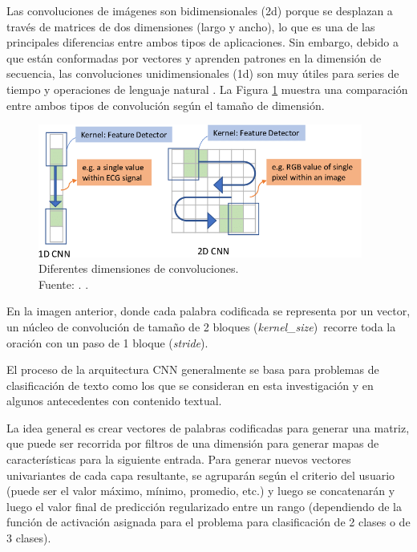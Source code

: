 \begin{itemize}
	Las convoluciones de imágenes son bidimensionales (2d) porque se desplazan a través de matrices de dos dimensiones (largo y ancho), lo que es una de las principales diferencias entre ambos tipos de aplicaciones. Sin embargo, debido a que están conformadas por vectores y aprenden patrones en la dimensión de secuencia, las convoluciones unidimensionales (1d) son muy útiles para series de tiempo y operaciones de lenguaje natural \parencite{bk_rao2019nlp_pytorch}. La Figura \ref{2:fig41} muestra una comparación entre ambos tipos de convolución según el tamaño de dimensión.

	\begin{figure}[!ht]
		\begin{center}
			\includegraphics[width=0.95\textwidth]{2/figures/2D-convolutional-example.png}
			\caption[Diferentes dimensiones de convoluciones]{Diferentes dimensiones de convoluciones.\\
			Fuente: \cite{tec_missinglink_conv1d}. .}
			\label{2:fig41}
		\end{center}
	\end{figure}

	En la imagen anterior, donde cada palabra codificada se representa por un vector, un núcleo de convolución de tamaño de 2 bloques (\textit{kernel\_size}) recorre toda la oración con un paso de 1 bloque (\textit{stride}).

	El proceso de la arquitectura CNN generalmente se basa para problemas de clasificación de texto como los que se consideran en esta investigación y en algunos antecedentes con contenido textual.
	
	La idea general es crear vectores de palabras codificadas para generar una matriz, que puede ser recorrida por filtros de una dimensión para generar mapas de características para la siguiente entrada. Para generar nuevos vectores univariantes de cada capa resultante, se agruparán según el criterio del usuario (puede ser el valor máximo, mínimo, promedio, etc.) y luego se concatenarán y luego el valor final de predicción regularizado entre un rango (dependiendo de la función de activación asignada para el problema para clasificación de 2 clases o de 3 clases).


\end{itemize}
